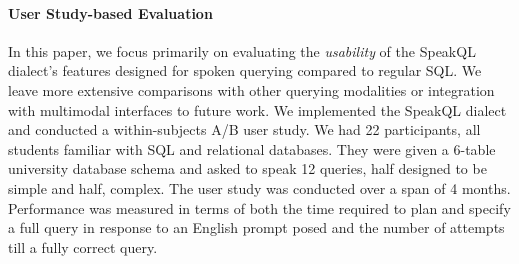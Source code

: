 \begin{itemize}

\end{itemize}

\paragraph{\textbf{User Study-based Evaluation}}

In this paper, we focus primarily on evaluating the \textit{usability} of the SpeakQL dialect's features designed for spoken querying compared to regular SQL. 
We leave more extensive comparisons with other querying modalities or integration with multimodal interfaces to future work.
We implemented the SpeakQL dialect and conducted a within-subjects A/B user study. 
We had 22 participants, all students familiar with SQL and relational databases. 
They were given a 6-table university database schema and asked to speak 12 queries, half designed to be simple and half, complex. The user study was conducted over a span of 4 months. 
Performance was measured in terms of both the time required to plan and specify a full query in response to an English prompt posed and the number of attempts till a fully correct query.

